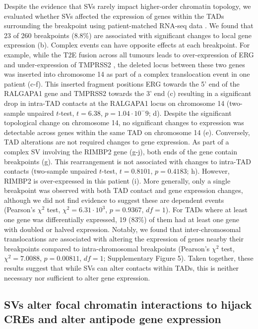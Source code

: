 Despite the evidence that SVs rarely impact higher-order chromatin topology, we evaluated whether SVs affected the expression of genes within the TADs surrounding the breakpoint using patient-matched RNA-seq data \cite{chenWidespreadFunctionalRNA2019}.
We found that 23 of 260 breakpoints (8.8\%) are associated with significant changes to local gene expression (b).
Complex events can have opposite effects at each breakpoint.
For example, while the T2E fusion across all tumours leads to over-expression of ERG and under-expression of TMPRSS2 \cite{fraserGenomicHallmarksLocalized2017,kronTMPRSS2ERGFusion2017}, the deleted locus between these two genes was inserted into chromosome 14 as part of a complex translocation event in one patient (c-f).
This inserted fragment positions ERG towards the 5' end of the RALGAPA1 gene and TMPRSS2 towards the 3' end (c) resulting in a significant drop in intra-TAD contacts at the RALGAPA1 locus on chromosome 14 (two-sample unpaired $t$-test, $t = 6.38$, $p =1.04 \cdot 10^-9$; d).
Despite the significant topological change on chromosome 14, no significant changes to expression was detectable across genes within the same TAD on chromosome 14 (e).
Conversely, TAD alterations are not required changes to gene expression.
As part of a complex SV involving the RIMBP2 gene (g-j), both ends of the gene contain breakpoints (g).
This rearrangement is not associated with changes to intra-TAD contacts (two-sample unpaired $t$-test, $t = 0.8101$, $p = 0.4183$; h).
However, RIMBP2 is over-expressed in this patient (i).
More generally, only a single breakpoint was observed with both TAD contact and gene expression changes, although we did not find evidence to suggest these are dependent events (Pearson's $\chi^2$ test, $\chi^2 = 6.31 \cdot 10^3$, $p = 0.9367$, $df = 1$).
For TADs where at least one gene was differentially expressed, 19 (83\%) of them had at least one gene with doubled or halved expression.
Notably, we found that inter-chromosomal translocations are associated with altering the expression of genes nearby their breakpoints compared to intra-chromosomal breakpoints (Pearson's $\chi^2$ test, $\chi^2 = 7.0088$, $p = 0.00811$, $df = 1$; Supplementary Figure 5).
Taken together, these results suggest that while SVs can alter contacts within TADs, this is neither necessary nor sufficient to alter gene expression.

\subsection{SVs alter focal chromatin interactions to hijack CREs and alter antipode gene expression}

